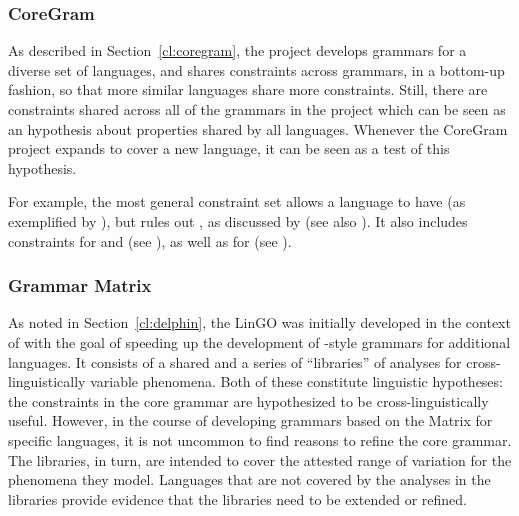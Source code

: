 \documentclass[output=paper,nonflat]{langsci/langscibook}
\begin{document}


\subsubsection{CoreGram}
\label{cl:lang-doc:coregram}

As described in Section~\ref{cl:coregram},
the  project develops grammars for a diverse set of languages,
and shares constraints across grammars, in a bottom-up fashion, so that more
similar languages share more constraints. Still, there are constraints
shared across all of the grammars in the project which can be seen
as an hypothesis about properties shared by all languages.
Whenever the CoreGram project expands to cover a new language,
it can be seen as a test of this hypothesis.

For example, the most general constraint set
allows a language to have 
(as exemplified by ),
but rules out ,
as discussed by \citet{MuellerCoreGram}
(see also ).
It also includes constraints for  and 
(see ),
as well as for 
(see ).



\subsubsection{Grammar Matrix}
\label{cl:lang-doc:gmcs}

As noted in Section~\ref{cl:delphin}, the LinGO 
\citep{BFO2002a-u,BDFPS2010a-u} was initially developed in
the context of  with the goal of speeding up the
development of \delphin-style grammars for additional languages. It
consists of a shared  and a series of ``libraries'' of
analyses for cross-linguistically variable phenomena. Both of these
constitute linguistic hypotheses: the constraints
in the core grammar are hypothesized to be cross-linguistically
useful. However, in the course of developing grammars based on the
Matrix for specific languages, it is not uncommon to find reasons to
refine the core grammar. The libraries, in turn, are intended to 
cover the attested range of variation for the phenomena they model.
Languages that are not covered by the analyses in the libraries provide
evidence that the libraries need to be extended or refined. 
\end{document}
